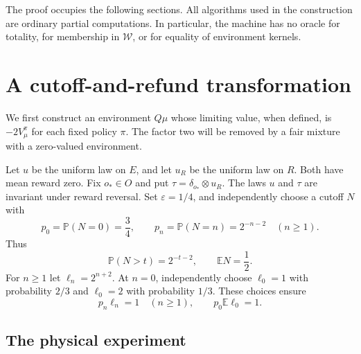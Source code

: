 \documentclass[11pt]{article}
\theoremstyle{definition}
\theoremstyle{remark}
\newcommand{\W}{\mathcal W}
\newcommand{\Prob}{\mathbb P}
\newcommand{\Exp}{\mathbb E}
\newcommand{\eps}{\varepsilon}
\begin{document}
The proof occupies the following sections.  All algorithms used in the
construction are ordinary partial computations.  In particular, the
machine has no oracle for totality, for membership in $\W$, or for
equality of environment kernels.

\section{A cutoff-and-refund transformation}
\label{sec:anti}

We first construct an environment $Q\mu$ whose limiting value, when
defined, is $-2V_\mu^\pi$ for each fixed policy $\pi$.  The factor two
will be removed by a fair mixture with a zero-valued environment.

Let $u$ be the uniform law on $E$, and let $u_R$ be the uniform law on
$R$.  Both have mean reward zero.  Fix $o_*\in O$ and put
$\tau=\delta_{o_*}\otimes u_R$.  The laws $u$ and $\tau$ are invariant
under reward reversal.  Set $\eps=1/4$, and independently choose a
cutoff $N$ with
\begin{equation}
  p_0=\Prob(N=0)=\frac34,
  \qquad p_n=\Prob(N=n)=2^{-n-2}\quad(n\ge1).
  \label{eq:cutoff}
\end{equation}
Thus
\begin{equation}
  \Prob(N>t)=2^{-t-2},\qquad \Exp N=\frac12.
  \label{eq:cutoff-tail}
\end{equation}
For $n\ge1$ let $\ell_n=2^{n+2}$.  At $n=0$, independently choose
$\ell_0=1$ with probability $2/3$ and $\ell_0=2$ with probability
$1/3$.  These choices ensure
\begin{equation}
  p_n\ell_n=1\quad(n\ge1),
  \qquad p_0\Exp\ell_0=1.
  \label{eq:importance-normalization}
\end{equation}

\subsection{The physical experiment}
\end{document}
